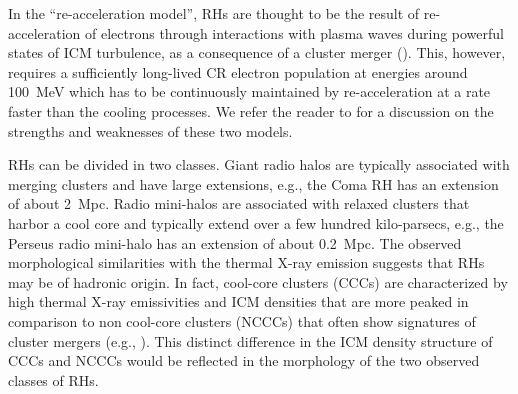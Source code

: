 \documentclass[useAMS,usenatbib]{mn2e}
\begin{document}
In the ``re-acceleration model'', RHs are thought to be the result of
re-acceleration of electrons through interactions with plasma waves during
powerful states of ICM turbulence, as a consequence of a cluster merger
(\citealp{1987A&A...182...21S, 1993ApJ...406..399G, 2002A&A...386..456G,
  2004MNRAS.350.1174B, 2005MNRAS.363.1173B, 2007MNRAS.378..245B,
  2010arXiv1008.0184B, 2009A&A...507..661B, 2012arXiv1211.3337D}). This,
however, requires a sufficiently long-lived CR electron population at energies
around 100~MeV which has to be continuously maintained by re-acceleration at a
rate faster than the cooling processes.  We refer the reader to
\citet{2011A&A...527A..99E} for a discussion on the strengths and weaknesses of
these two models.

RHs can be divided in two classes. Giant radio halos are typically associated
with merging clusters and have large extensions, e.g., the Coma RH has an
extension of about 2~Mpc. Radio mini-halos are associated with relaxed clusters
that harbor a cool core and typically extend over a few hundred kilo-parsecs,
e.g., the Perseus radio mini-halo has an extension of about 0.2~Mpc.  The
observed morphological similarities with the thermal X-ray emission suggests
that RHs may be of hadronic origin. In fact, cool-core clusters (CCCs) are
characterized by high thermal X-ray emissivities and ICM densities that are more
peaked in comparison to non cool-core clusters (NCCCs) that often show
signatures of cluster mergers (e.g., \citealp{2008A&A...487..431C}). This
distinct difference in the ICM density structure of CCCs and NCCCs would be
reflected in the morphology of the two observed classes of RHs.
\end{document}
